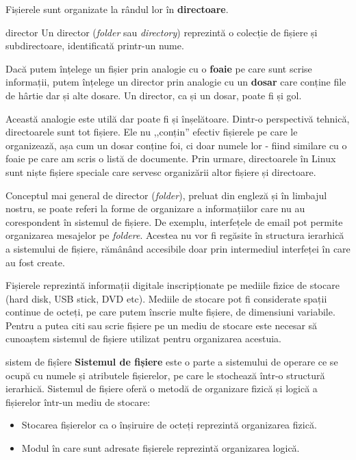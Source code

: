 Fișierele sunt organizate la rândul lor în \textbf{directoare}.

\begin{definition}{director}
Un director (\textit{folder} sau \textit{directory}) reprezintă o colecție de fișiere și subdirectoare, identificată printr-un nume.
\end{definition}

Dacă putem înțelege un fișier prin analogie cu o \textbf{foaie} pe care sunt
scrise informații, putem înțelege un director prin analogie cu un \textbf{dosar}
care conține file de hârtie dar și alte dosare. Un director, ca și un dosar,
poate fi și gol.

Această analogie este utilă dar poate fi și înșelătoare. Dintr-o perspectivă tehnică, directoarele sunt tot fișiere. Ele nu ,,conțin'' efectiv
fișierele pe care le organizează, așa cum un dosar conține foi, ci doar numele
lor - fiind similare cu o foaie pe care am scris o listă de documente. Prin
urmare, directoarele în Linux sunt niște fișiere speciale care servesc
organizării altor fișiere și directoare.

\begin{note}
Conceptul mai general de director (\textit{folder}), preluat din engleză și în limbajul nostru, se
poate referi la forme de organizare a informațiilor care nu au corespondent în
sistemul de fișiere. De exemplu, interfețele de email pot permite organizarea
mesajelor pe \textit{foldere}. Acestea nu vor fi regăsite în structura ierarhică a
sistemului de fișiere, rămânând accesibile doar prin intermediul interfeței în
care au fost create.
\end{note}

Fișierele reprezintă informații digitale inscripționate pe mediile fizice de
stocare (hard disk, USB stick, DVD etc). Mediile de stocare pot fi considerate
spații continue de octeți, pe care putem înscrie multe fișiere, de dimensiuni
variabile. Pentru a putea citi sau scrie fișiere pe un mediu de stocare este
necesar să cunoaștem sistemul de fișiere utilizat pentru organizarea acestuia.

\begin{definition}{sistem de fișîere}
\textbf{Sistemul de fișiere} este o parte a sistemului de operare ce se ocupă cu
numele și atributele fișierelor, pe care le stochează într-o structură
ierarhică. Sistemul de fișiere oferă o metodă de organizare fizică și logică a
fișierelor într-un mediu de stocare:

\begin{itemize}
	\item Stocarea fișierelor ca o înșiruire de octeți reprezintă
		organizarea fizică.
	\item Modul în care sunt adresate fișierele reprezintă organizarea
		logică.
\end{itemize}
\end{definition}

